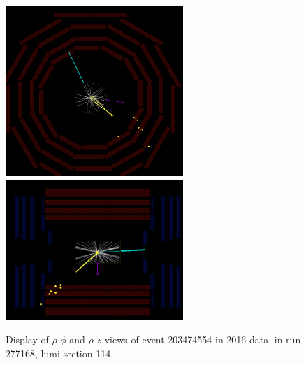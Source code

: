 \begin{figure}[htpb]
  \centering
  \includegraphics[width=0.6\textwidth]{figures/displaced/event-277168_203474554_114_RhoPhi.png}
  \includegraphics[width=0.6\textwidth]{figures/displaced/event-277168_203474554_114_RhoZ.png}
  \caption{Display of $\rho$-$\phi$ and $\rho$-$z$ views of event 203474554 in 2016 data, in run 277168, lumi section 114.}
  \label{fig:dd:event-114}
\end{figure}

